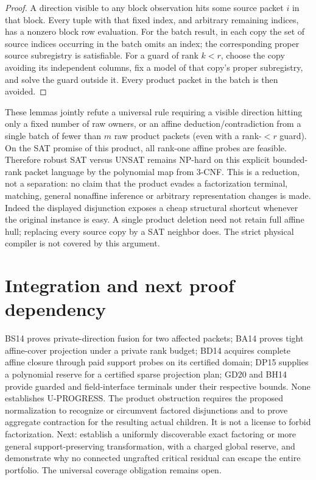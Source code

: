 \documentclass[11pt]{article}
\begin{document}
\begin{proof}
A direction visible to any block observation hits some source packet $i$ in that block. Every tuple with that fixed index, and arbitrary remaining indices, has a nonzero block row evaluation. For the batch result, in each copy the set of source indices occurring in the batch omits an index; the corresponding proper source subregistry is satisfiable. For a guard of rank $k<r$, choose the copy avoiding its independent columns, fix a model of that copy's proper subregistry, and solve the guard outside it. Every product packet in the batch is then avoided.
\end{proof}
These lemmas jointly refute a universal rule requiring a visible direction hitting only a fixed number of raw owners, or an affine deduction/contradiction from a single batch of fewer than $m$ raw product packets (even with a rank-$<r$ guard). On the SAT promise of this product, all rank-one affine probes are feasible. Therefore robust SAT versus UNSAT remains NP-hard on this explicit bounded-rank packet language by the polynomial map from 3-CNF. This is a reduction, not a separation: no claim that the product evades a factorization terminal, matching, general nonaffine inference or arbitrary representation changes is made. Indeed the displayed disjunction exposes a cheap structural shortcut whenever the original instance is easy. A single product deletion need not retain full affine hull; replacing every source copy by a SAT neighbor does. The strict physical compiler is not covered by this argument.
\section{Integration and next proof dependency}\label{sec:integration}
BS14 proves private-direction fusion for two affected packets; BA14 proves tight affine-cover projection under a private rank budget; BD14 acquires complete affine closure through paid support probes on its certified domain; DP15 supplies a polynomial reserve for a certified sparse projection plan; GD20 and BH14 provide guarded and field-interface terminals under their respective bounds. None establishes U-PROGRESS. The product obstruction requires the proposed normalization to recognize or circumvent factored disjunctions and to prove aggregate contraction for the resulting actual children. It is not a license to forbid factorization. Next: establish a uniformly discoverable exact factoring or more general support-preserving transformation, with a charged global reserve, and demonstrate why no connected ungrafted critical residual can escape the entire portfolio. The universal coverage obligation remains open.
\end{document}
